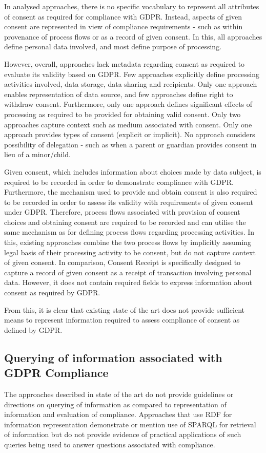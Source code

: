 In analysed approaches, there is no specific vocabulary to represent all attributes of consent as required for compliance with GDPR. Instead, aspects of given consent are represented in view of compliance requirements - such as within provenance of process flows or as a record of given consent. In this, all approaches define personal data involved, and most define purpose of processing. 

However, overall, approaches lack metadata regarding consent as required to evaluate its validity based on GDPR. Few approaches explicitly define  processing activities involved, data storage, data sharing and recipients. Only one approach enables representation of data source, and few approaches define right to withdraw consent. Furthermore, only one approach defines significant effects of processing as required to be provided for obtaining valid consent. Only two approaches capture context such as medium associated with consent. Only one approach provides types of consent (explicit or implicit). No approach considers possibility of delegation - such as when a parent or guardian provides consent in lieu of a minor/child.

Given consent, which includes information about choices made by data subject, is required to be recorded in order to demonstrate compliance with GDPR. Furthermore, the mechanism used to provide and obtain consent is also required to be recorded in order to assess its validity with requirements of given consent under GDPR. Therefore, process flows associated with provision of consent choices and obtaining consent are required to be recorded and can utilise the same mechanism as for defining process flows regarding processing activities. In this, existing approaches combine the two process flows by implicitly assuming legal basis of their processing activity to be consent, but do not capture context of given consent. In comparison, Consent Receipt is specifically designed to capture a record of given consent as a receipt of transaction involving personal data. However, it does not contain required fields to express information about consent as required by GDPR.

From this, it is clear that existing state of the art does not provide sufficient means to represent information required to assess compliance of consent as defined by GDPR. 

\subsection{Querying of information associated with GDPR Compliance}
The approaches described in state of the art do not provide guidelines or directions on querying of information as compared to representation of information and evaluation of compliance. Approaches that use RDF for information representation demonstrate or mention use of SPARQL for retrieval of information but do not provide evidence of practical applications of such queries being used to answer questions associated with compliance.

